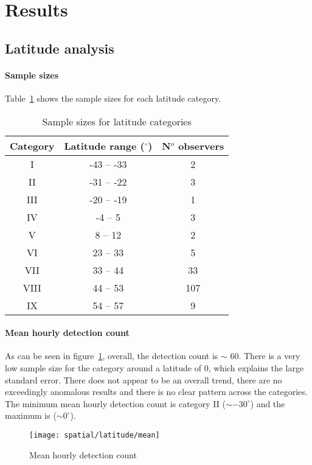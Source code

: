 \section{Results}

\subsection{Latitude analysis}
\paragraph{Sample sizes \\}
Table~\ref{tab:spat:lat} shows the sample sizes for each latitude category.
\begin{table}[h!]
	\centering
	\begin{tabular}{ccc}
		\hline 
		Category & Latitude range ($^{\circ}$) & N$^o$ observers \\ 
		\hline 
		I & -43 -- -33 & 2 \\
		II & -31 -- -22 & 3 \\
		III & -20 -- -19 & 1 \\
		IV & -4 -- 5 & 3 \\
		V & 8 -- 12 & 2 \\
		VI & 23 -- 33 & 5 \\
		VII & 33 -- 44 & 33 \\
		VIII & 44 -- 53 & 107\\
		IX & 54 -- 57 & 9 \\  
		\hline
	\end{tabular} 
	\caption{Sample sizes for latitude categories \label{tab:spat:lat}}
\end{table}

\paragraph{Mean hourly detection count\\}
As can be seen in figure~\ref{fig:spat:lat:mean}, overall, the detection count is ${\sim}$ 60. There is a very low sample size for the category around a latitude of 0, which explains the large standard error. There does not appear to be an overall trend, there are no exceedingly anomalous results and there is no clear pattern across the categories. The minimum mean hourly detection count is category II (${\sim} -30^{\circ}$) and the maximum is (${\sim 0}^{\circ}$).
\begin{figure}[h!]
	\centering
	\texttt{[image: spatial/latitude/mean]}
	\caption{Mean hourly detection count
		\label{fig:spat:lat:mean}}
\end{figure}
